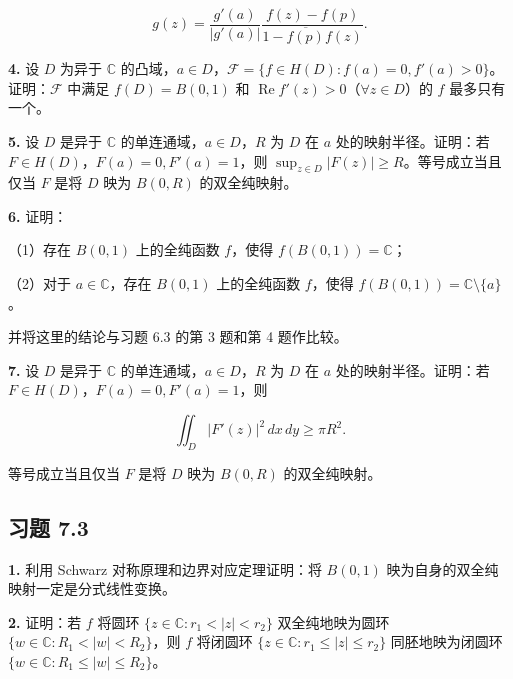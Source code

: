 \documentclass[11pt,a4paper]{article}
\begin{document}
\[
g(z)=\frac{g'(a)}{|g'(a)|}\frac{f(z)-f(p)}{1-\overline{f(p)}f(z)}.
\]

\par{}
\noindent\textbf{4.} 设 \(D\) 为异于 \(\mathbb C\)
的凸域，\(a\in D\)，\(\mathcal F=\{f\in H(D):f(a)=0,f'(a)>0\}\)。证明：\(\mathcal F\)
中满足 \(f(D)=B(0,1)\) 和
\(\operatorname{Re}f'(z)>0\)（\(\forall z\in D\)）的 \(f\)
最多只有一个。

\par{}
\noindent\textbf{5.} 设 \(D\) 是异于 \(\mathbb C\) 的单连通域，\(a\in D\)，\(R\)
为 \(D\) 在 \(a\) 处的映射半径。证明：若
\(F\in H(D)\)，\(F(a)=0,F'(a)=1\)，则
\(\sup_{z\in D}|F(z)|\ge R\)。等号成立当且仅当 \(F\) 是将 \(D\) 映为
\(B(0,R)\) 的双全纯映射。

\par{}
\noindent\textbf{6.} 证明：

（1）存在 \(B(0,1)\) 上的全纯函数 \(f\)，使得 \(f(B(0,1))=\mathbb C\)；

（2）对于 \(a\in\mathbb C\)，存在 \(B(0,1)\) 上的全纯函数 \(f\)，使得
\(f(B(0,1))=\mathbb C\setminus\{a\}\)。

并将这里的结论与习题 6.3 的第 3 题和第 4 题作比较。

\par{}
\noindent\textbf{7.} 设 \(D\) 是异于 \(\mathbb C\) 的单连通域，\(a\in D\)，\(R\)
为 \(D\) 在 \(a\) 处的映射半径。证明：若
\(F\in H(D)\)，\(F(a)=0,F'(a)=1\)，则

\[
\iint_D|F'(z)|^2\,dx\,dy\ge\pi R^2.
\]

等号成立当且仅当 \(F\) 是将 \(D\) 映为 \(B(0,R)\) 的双全纯映射。

\subsection{习题 7.3}\label{ch07-practice-heading-4}

\par{}
\noindent\textbf{1.} 利用 Schwarz 对称原理和边界对应定理证明：将 \(B(0,1)\)
映为自身的双全纯映射一定是分式线性变换。

\par{}
\noindent\textbf{2.} 证明：若 \(f\) 将圆环 \(\{z\in\mathbb C:r_1<|z|<r_2\}\)
双全纯地映为圆环 \(\{w\in\mathbb C:R_1<|w|<R_2\}\)，则 \(f\) 将闭圆环
\(\{z\in\mathbb C:r_1\le|z|\le r_2\}\) 同胚地映为闭圆环
\(\{w\in\mathbb C:R_1\le|w|\le R_2\}\)。
\end{document}
